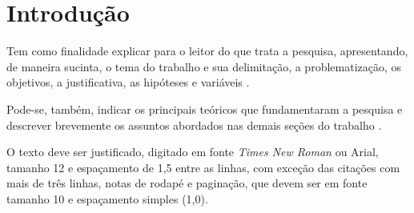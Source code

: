 \chapter{Introdução}

Tem como finalidade explicar para o leitor do que trata a pesquisa, apresentando, de maneira sucinta, o tema do trabalho e sua delimitação, a problematização, os objetivos, a justificativa, as hipóteses e variáveis \cite{andrade,koche,medeiros}.

Pode-se, também, indicar os principais teóricos que fundamentaram a pesquisa e descrever brevemente os assuntos abordados nas demais seções do trabalho \cite{medeiros}.

O texto deve ser justificado, digitado em fonte \textit{Times New Roman} ou Arial, tamanho 12 e espaçamento de 1,5 entre as linhas, com exceção das citações com mais de três linhas, notas de rodapé e paginação, que devem ser em fonte tamanho 10 e espaçamento simples (1,0).